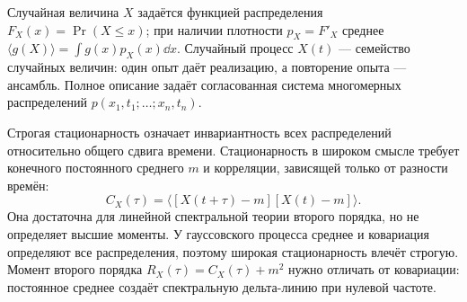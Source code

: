 
Случайная величина $X$ задаётся функцией распределения $F_X(x)=\Pr(X\leq x)$; при наличии плотности $p_X=F'_X$ среднее $\langle g(X)\rangle=\int g(x)p_X(x)\dd x$. Случайный процесс $X(t)$ — семейство случайных величин: один опыт даёт реализацию, а повторение опыта — ансамбль. Полное описание задаёт согласованная система многомерных распределений $p(x_1,t_1;\ldots;x_n,t_n)$.

Строгая стационарность означает инвариантность всех распределений относительно общего сдвига времени. Стационарность в широком смысле требует конечного постоянного среднего $m$ и корреляции, зависящей только от разности времён:
\begin{equation}
 C_X(\tau)=\langle[X(t+\tau)-m][X(t)-m]\rangle.
\end{equation}
Она достаточна для линейной спектральной теории второго порядка, но не определяет высшие моменты. У гауссовского процесса среднее и ковариация определяют все распределения, поэтому широкая стационарность влечёт строгую. Момент второго порядка $R_X(\tau)=C_X(\tau)+m^2$ нужно отличать от ковариации: постоянное среднее создаёт спектральную дельта-линию при нулевой частоте.
